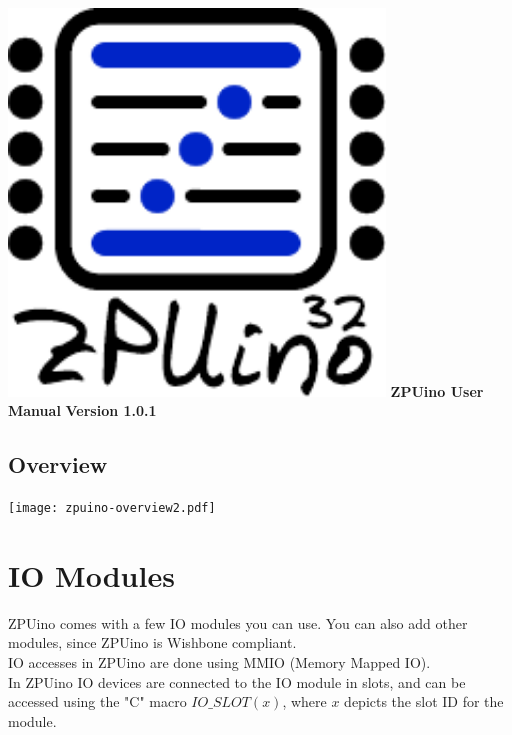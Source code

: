 \documentclass[12pt,a4paper,openany,smallheadings,headinclude,headsepline,final]{scrreprt}
\begin{document}
\pagestyle{headings}

\parindent 0cm
\parskip 0.2cm

\begin{titlepage}
\begin{center}
\includegraphics[width=10cm]{zpuino32.pdf}
\huge{\bfseries{ZPUino User Manual}}
\large{\bfseries{Version 1.0.1}}
\end{center}

\end{titlepage}

\tableofcontents
\clearpage




\section{Overview}
\texttt{[image: zpuino-overview2.pdf]}



\chapter{IO Modules}
ZPUino comes with a few IO modules you can use. You can also add other modules, since ZPUino is Wishbone compliant.\\
IO accesses in ZPUino are done using MMIO (Memory Mapped IO).\\
In ZPUino IO devices are connected to the IO module in slots, and can be accessed using the "C" macro $IO\_SLOT(x)$, where $x$
depicts the slot ID for the module.\\
\end{document}
